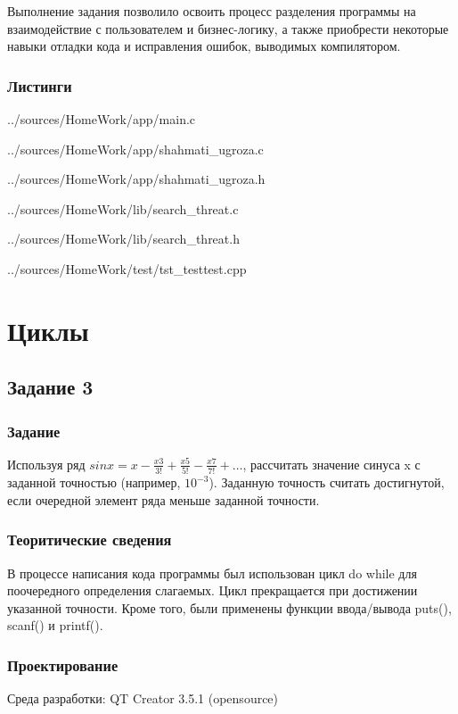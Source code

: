 \documentclass[12pt,a4paper]{report}
\begin{document}
Выполнение задания позволило освоить процесс разделения программы на взаимодействие с пользователем и бизнес-логику, а также приобрести некоторые навыки отладки кода и исправления ошибок, выводимых компилятором.

\subsection*{Листинги}

{../sources/HomeWork/app/main.c}


{../sources/HomeWork/app/shahmati_ugroza.c}


{../sources/HomeWork/app/shahmati_ugroza.h}


{../sources/HomeWork/lib/search_threat.c}


{../sources/HomeWork/lib/search_threat.h}


{../sources/HomeWork/test/tst_testtest.cpp}

\chapter{Циклы}
\section{Задание 3}
\subsection{Задание}
Используя ряд $sin x = x - \frac{x3}{3!} + \frac{x5}{5!} - \frac{x7}{7!} + …$, рассчитать значение синуса x с заданной точностью (например, $10^{-3}$). Заданную точность считать достигнутой, если очередной элемент ряда меньше заданной точности.

\subsection{Теоритические сведения}
В процессе написания кода программы был использован цикл do while для поочередного определения слагаемых. Цикл прекращается при достижении указанной точности. Кроме того, были применены функции ввода/вывода puts(), scanf() и printf().
  
\subsection{Проектирование}
Среда разработки: QT Creator 3.5.1 (opensource)
\end{document}
